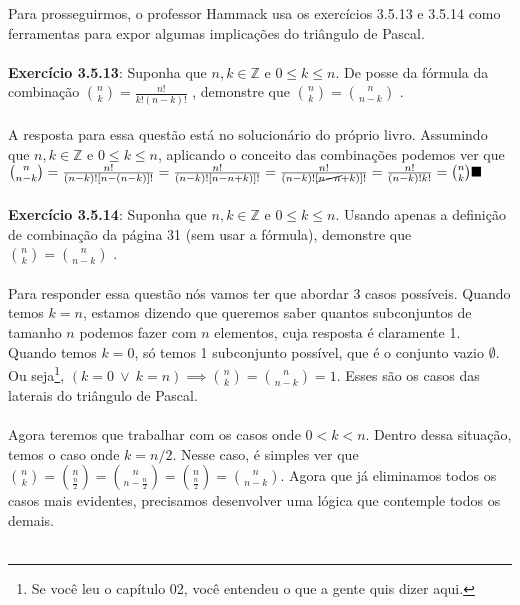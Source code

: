 \documentclass[main.tex]{subfiles}
\begin{document}
Para prosseguirmos, o professor Hammack usa os exercícios 3.5.13 e 3.5.14 como ferramentas para expor algumas implicações do triângulo de Pascal.
\\~\\
\textbf{Exercício 3.5.13}: Suponha que $n,k \in \mathbb{Z}$ e $0 \leq k \leq n$. De posse da fórmula da combinação \tiny ${n \choose k} = \frac{n!}{k!(n-k)!}$ \normalsize , demonstre que \tiny $ {n \choose k} = {n \choose {n-k}} $ \normalsize.
\\~\\
A resposta para essa questão está no solucionário do próprio livro. Assumindo que $ n,k \in \mathbb{Z} $ e $ 0 \leq k \leq n $, aplicando o conceito das combinações podemos ver que \tiny $ {n \choose n - k} = \frac{n!}{(n-k)![n-(n-k)]!} = \frac{n!}{(n-k)![n-n+k)]!} = \frac{n!}{(n-k)![\cancel{n-n}+k)]!} = \frac{n!}{(n-k)!k!} = {n \choose k} \blacksquare$ \normalsize
\\~\\
\textbf{Exercício 3.5.14}: Suponha que $n,k \in \mathbb{Z}$ e $0 \leq k \leq n$. Usando apenas a definição de combinação da página 31 (sem usar a fórmula), demonstre que \tiny $ {n \choose k} = {n \choose {n-k}} $ \normalsize.  
\\~\\
Para responder essa questão nós vamos ter que abordar 3 casos possíveis. Quando temos $ k = n $, estamos dizendo que queremos saber quantos subconjuntos de tamanho $n$ podemos fazer com $n$ elementos, cuja resposta é claramente 1. Quando temos $ k = 0 $, só temos 1 subconjunto possível, que é o conjunto vazio $\emptyset$. Ou seja\footnote{Se você leu o capítulo 02, você entendeu o que a gente quis dizer aqui.}, $(k = 0 \ \lor \  k = n) \implies {n \choose k} = {n \choose n - k} = 1$. Esses são os casos das laterais do triângulo de Pascal.
\\~\\
Agora teremos que trabalhar com os casos onde $0 < k < n$. Dentro dessa situação, temos o caso onde $k = n/2$. Nesse caso, é simples ver que ${n \choose k} = {n \choose \frac{n}{2}} = {n \choose n - \frac{n}{2}} = {n \choose \frac{n}{2}} = {n \choose n - k}$. Agora que já eliminamos todos os casos mais evidentes, precisamos desenvolver uma lógica que contemple todos os demais.
\\~\\
\end{document}
